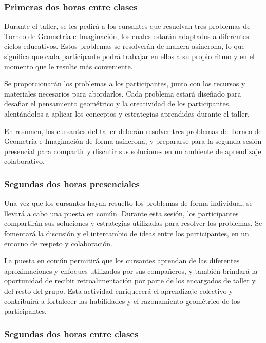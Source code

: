 \subsubsection{Primeras dos horas entre clases}

Durante el taller, se les pedirá a los cursantes que resuelvan tres problemas de Torneo de Geometría e Imaginación, los cuales estarán adaptados a diferentes ciclos educativos. Estos problemas se resolverán de manera asíncrona, lo que significa que cada participante podrá trabajar en ellos a su propio ritmo y en el momento que le resulte más conveniente.

Se proporcionarán los problemas a los participantes, junto con los recursos y materiales necesarios para abordarlos. Cada problema estará diseñado para desafiar el pensamiento geométrico y la creatividad de los participantes, alentándolos a aplicar los conceptos y estrategias aprendidas durante el taller.

En resumen, los cursantes del taller deberán resolver tres problemas de Torneo de Geometría e Imaginación de forma asíncrona, y prepararse para la segunda sesión presencial para compartir y discutir sus soluciones en un ambiente de aprendizaje colaborativo. \textcite{oma2023}

\subsubsection{Segundas dos horas presenciales}

Una vez que los cursantes hayan resuelto los problemas de forma individual, se llevará a cabo una puesta en común. Durante esta sesión, los participantes compartirán sus soluciones y estrategias utilizadas para resolver los problemas. Se fomentará la discusión y el intercambio de ideas entre los participantes, en un entorno de respeto y colaboración.

La puesta en común permitirá que los cursantes aprendan de las diferentes aproximaciones y enfoques utilizados por sus compañeros, y también brindará la oportunidad de recibir retroalimentación por parte de los encargados de taller y del resto del grupo. Esta actividad enriquecerá el aprendizaje colectivo y contribuirá a fortalecer las habilidades y el razonamiento geométrico de los participantes.

\subsubsection{Segundas dos horas entre clases}

